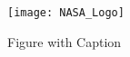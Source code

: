 \begin{figure}[H]
   \centering
   \texttt{[image: NASA\_Logo]}
   \caption{Figure with Caption} 
   \label{fig:nasa-logo}
\end{figure}
